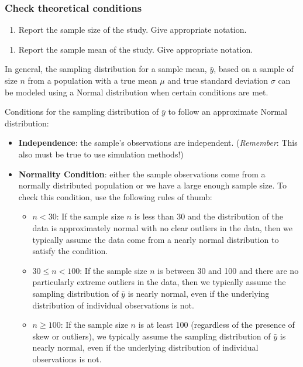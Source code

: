 \documentclass[
]{report}
\providecommand{\tightlist}{%
  \setlength{\itemsep}{0pt}\setlength{\parskip}{0pt}}
\begin{document}
\subsubsection*{Check theoretical conditions}\label{check-theoretical-conditions}

\begin{enumerate}
\def\labelenumi{\arabic{enumi}.}
\setcounter{enumi}{2}
\tightlist
\item
  Report the sample size of the study. Give appropriate notation.
\end{enumerate}

\vspace{0.4in}

\begin{enumerate}
\def\labelenumi{\arabic{enumi}.}
\setcounter{enumi}{3}
\tightlist
\item
  Report the sample mean of the study. Give appropriate notation.
\end{enumerate}

\vspace{0.4in}

In general, the sampling distribution for a sample mean, \(\bar{y}\), based on a sample of size \(n\) from a population with a true mean \(\mu\) and true standard deviation \(\sigma\) can be modeled using a Normal distribution when certain conditions are met.

\newpage

Conditions for the sampling distribution of \(\bar{y}\) to follow an approximate Normal distribution:

\begin{itemize}
\item
  \textbf{Independence}: the sample's observations are independent. (\emph{Remember}: This also must be true to use simulation methods!)
\item
  \textbf{Normality Condition}: either the sample observations come from a normally distributed population or we have a large enough sample size. To check this condition, use the following rules of thumb:

  \begin{itemize}
  \item
    \(n < 30\): If the sample size \(n\) is less than 30 and the distribution of the data is approximately normal with no clear outliers in the data, then we typically assume the data come from a nearly normal distribution to satisfy the condition.
  \item
    \(30 \leq n < 100\): If the sample size \(n\) is between 30 and 100 and there are no particularly extreme outliers in the data, then we typically assume the sampling distribution of \(\bar{y}\) is nearly normal, even if the underlying distribution of individual observations is not.
  \item
    \(n \geq 100\): If the sample size \(n\) is at least 100 (regardless of the presence of skew or outliers), we typically assume the sampling distribution of \(\bar{y}\) is nearly normal, even if the underlying distribution of individual observations is not.
  \end{itemize}
\end{itemize}
\end{document}
